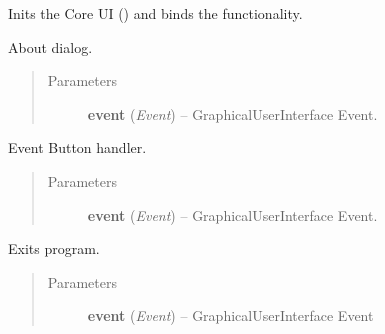\documentclass[letterpaper,10pt,english]{sphinxmanual}
\begin{document}
\begin{fulllineitems}
\begin{fulllineitems}
\end{fulllineitems}


\begin{fulllineitems}
\label{diwacs:diwacs.GraphicalUserInterface.InitUICore}
Inits the Core UI () and
binds the functionality.

\end{fulllineitems}


\begin{fulllineitems}
\label{diwacs:diwacs.GraphicalUserInterface.OnAboutBox}
About dialog.
\begin{quote}\begin{description}
\item[{Parameters}] \leavevmode
\textbf{event} (\emph{Event}) -- GraphicalUserInterface Event.

\end{description}\end{quote}

\end{fulllineitems}


\begin{fulllineitems}
\label{diwacs:diwacs.GraphicalUserInterface.OnEventButton}
Event Button handler.
\begin{quote}\begin{description}
\item[{Parameters}] \leavevmode
\textbf{event} (\emph{Event}) -- GraphicalUserInterface Event.

\end{description}\end{quote}

\end{fulllineitems}


\begin{fulllineitems}
\label{diwacs:diwacs.GraphicalUserInterface.OnExit}
Exits program.
\begin{quote}\begin{description}
\item[{Parameters}] \leavevmode
\textbf{event} (\emph{Event}) -- GraphicalUserInterface Event


\end{description}
\end{quote}
\end{fulllineitems}
\end{fulllineitems}
\end{document}
